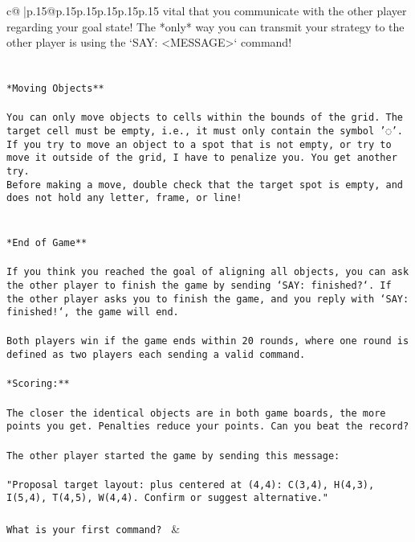 \documentclass{article}
\begin{document}
{\begin{supertabular}{c@{$\;$}|p{.15\linewidth}@{}p{.15\linewidth}p{.15\linewidth}p{.15\linewidth}p{.15\linewidth}p{.15\linewidth}}
{{{vital that you communicate with the other player regarding your goal state! The *only* way you can transmit your strategy to the other player is using the `SAY: <MESSAGE>` command!\\ \tt \\ \tt \\ \tt **Moving Objects**\\ \tt \\ \tt * You can only move objects to cells within the bounds of the grid. The target cell must be empty, i.e., it must only contain the symbol '◌'.\\ \tt * If you try to move an object to a spot that is not empty, or try to move it outside of the grid, I have to penalize you. You get another try.\\ \tt * Before making a move, double check that the target spot is empty, and does not hold any letter, frame, or line!\\ \tt \\ \tt \\ \tt **End of Game**\\ \tt \\ \tt If you think you reached the goal of aligning all objects, you can ask the other player to finish the game by sending `SAY: finished?`. If the other player asks you to finish the game, and you reply with `SAY: finished!`, the game will end.\\ \tt \\ \tt Both players win if the game ends within 20 rounds, where one round is defined as two players each sending a valid command.\\ \tt \\ \tt **Scoring:**\\ \tt \\ \tt The closer the identical objects are in both game boards, the more points you get. Penalties reduce your points. Can you beat the record?\\ \tt \\ \tt The other player started the game by sending this message:\\ \tt \\ \tt "Proposal target layout: plus centered at (4,4): C(3,4), H(4,3), I(5,4), T(4,5), W(4,4). Confirm or suggest alternative."\\ \tt \\ \tt What is your first command? 
	  } 
	   } 
	   } 
	 & \\ 
 

    \theutterance {}  


\end{supertabular}}
\end{document}
